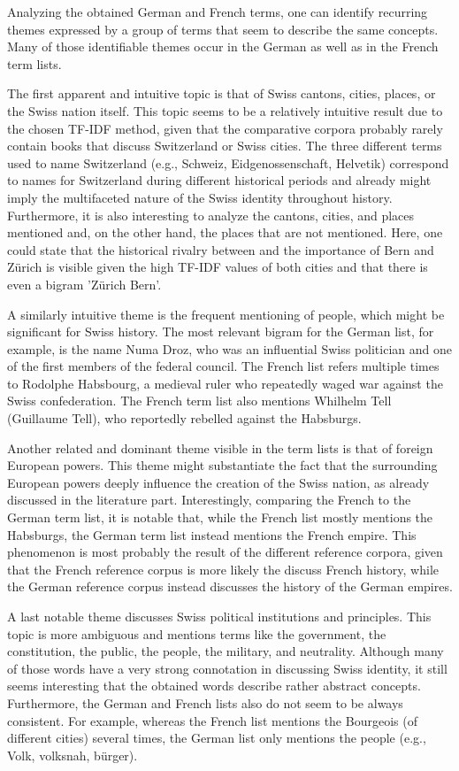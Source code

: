 \documentclass[11pt]{article}
\begin{document}
Analyzing the obtained German and French terms, one can identify recurring themes expressed by a group of terms that seem to describe the same concepts. Many of those identifiable themes occur in the German as well as in the French term lists.  \par 
The first apparent and intuitive topic is that of Swiss cantons, cities, places, or the Swiss nation itself. This topic seems to be a relatively intuitive result due to the chosen TF-IDF method, given that the comparative corpora probably rarely contain books that discuss Switzerland or Swiss cities. The three different terms used to name Switzerland (e.g., Schweiz, Eidgenossenschaft, Helvetik) correspond to names for Switzerland during different historical periods and already might imply the multifaceted nature of the Swiss identity throughout history. Furthermore, it is also interesting to analyze the cantons, cities, and places mentioned and, on the other hand, the places that are not mentioned. Here, one could state that the historical rivalry between and the importance of Bern and Zürich is visible given the high TF-IDF values of both cities and that there is even a bigram 'Zürich Bern'. \par
A similarly intuitive theme is the frequent mentioning of people, which might be significant for Swiss history. The most relevant bigram for the German list, for example, is the name Numa Droz, who was an influential Swiss politician and one of the first members of the federal council. The French list refers multiple times to Rodolphe Habsbourg, a medieval ruler who repeatedly waged war against the Swiss confederation. The French term list also mentions Whilhelm Tell (Guillaume Tell), who reportedly rebelled against the Habsburgs. \par
Another related and dominant theme visible in the term lists is that of foreign European powers. This theme might substantiate the fact that the surrounding European powers deeply influence the creation of the Swiss nation, as already discussed in the literature part. Interestingly, comparing the French to the German term list, it is notable that, while the French list mostly mentions the Habsburgs, the German term list instead mentions the French empire. This phenomenon is most probably the result of the different reference corpora, given that the French reference corpus is more likely the discuss French history, while the German reference corpus instead discusses the history of the German empires.  \par
A last notable theme discusses Swiss political institutions and principles. This topic is more ambiguous and mentions terms like the government, the constitution, the public, the people, the military, and neutrality. Although many of those words have a very strong connotation in discussing Swiss identity, it still seems interesting that the obtained words describe rather abstract concepts. Furthermore, the German and French lists also do not seem to be always consistent. For example, whereas the French list mentions the Bourgeois (of different cities) several times, the German list only mentions the people (e.g., Volk, volksnah, bürger). \par
\end{document}

